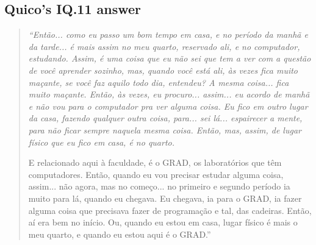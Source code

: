 \subsection{Quico’s IQ.11 answer}
\label{interview-exc-ss:quico-iq11}

\begin{quote}
    \itshape
    “Então... como eu passo um bom tempo em casa, e no período da manhã e da tarde... é mais assim no meu quarto, reservado ali, e no computador, estudando. Assim, é uma coisa que eu não sei que tem a ver com a questão de você aprender sozinho, mas, quando você está ali, às vezes fica muito maçante, se você faz aquilo todo dia, entendeu? A mesma coisa... fica muito maçante. Então, às vezes, eu procuro... assim... eu acordo de manhã e não vou para o computador pra ver alguma coisa. Eu fico em outro lugar da casa, fazendo qualquer outra coisa, para... sei lá... espairecer a mente, para não ficar sempre naquela mesma coisa. Então, mas, assim, de lugar físico que eu fico em casa, é no quarto. 

    E relacionado aqui à faculdade, é o GRAD, os laboratórios que têm computadores. Então, quando eu vou precisar estudar alguma coisa, assim... não agora, mas no começo... no primeiro e segundo período ia muito para lá, quando eu chegava. Eu chegava, ia para o GRAD, ia fazer alguma coisa que precisava fazer de programação e tal, das cadeiras. Então, aí era bem no início. Ou, quando eu estou em casa, lugar físico é mais o meu quarto, e quando eu estou aqui é o GRAD.”
\end{quote}



